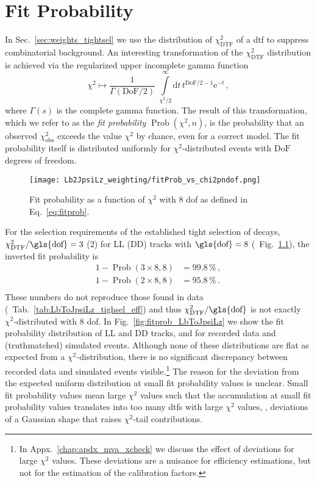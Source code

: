 \chapter{Fit Probability}
\label{chap:apdx_fitprob}
In Sec.~\ref{sec:weights_tightsel} we use the distribution of $\chi^2_\text{DTF}$ of a \gls{dtf} to suppress combinatorial background.
An interesting transformation of the $\chi^2_\text{DTF}$ distribution is achieved via the regularized upper incomplete gamma function
\begin{equation}
    \label{eq:fitprob}
    \chi^2 \mapsto \frac{1}{\Gamma \left(\text{DoF}/2 \right)} \; \int\limits_{\chi^2/2}^{\infty} \! \mathrm{d}t \, t^{\text{DoF}/2 - 1} \mathrm{e}^{-t} \,,
\end{equation}
where $\Gamma(s)$ is the complete gamma function.
The result of this transformation, which we refer to as the \textit{fit probability} $\operatorname{Prob}(\chi^2, n)$, is the probability that an observed  $\chi_\text{obs}^2$ exceeds the value $\chi^2$ by chance, even for a correct model.
The fit probability itself is distributed uniformly for $\chi^2$-distributed events with $\text{DoF}$ degrees of freedom.

\begin{figure}[htbp]
    \centering
    \texttt{[image: Lb2JpsiLz\_weighting/fitProb\_vs\_chi2pndof.png]}
    \caption{Fit probability as a function of $\chi^2$ with $8$ \gls{dof} as defined in Eq.~\eqref{eq:fitprob}.}
    \label{fig:fitprob_vs_chi2}
\end{figure}

For the selection requirements of the established tight selection of \decay{\Lb}{\jpsi\Lz} decays, $\chi^2_\text{DTF} / \text{\gls{dof}} = 3$ ($2$) for \gls{LL} (\gls{DD}) tracks with $\text{\gls{dof}} = 8$ (\cf{}~Fig.~\ref{fig:fitprob_vs_chi2}), the inverted fit probability is
\begin{align*}
    1 - \operatorname{Prob}(3 \times 8, 8) &= 99.8\,\% \,, \\
    1 - \operatorname{Prob}(2 \times 8, 8) &= 95.8\,\% \,. \\
\end{align*}
These numbers do not reproduce those found in data (\cf{}~Tab.~\ref{tab:LbToJpsiLz_tighsel_eff}) and thus
$\chi^2_\text{DTF} / \text{\gls{dof}}$ is not exactly $\chi^2$-distributed with $8$ \gls{dof}.
In Fig.~\ref{fig:fitprob_LbToJpsiLz} we show the fit probability distribution of \gls{LL} and \gls{DD} tracks, and for recorded data and (\gls{truthmatched}) simulated events.
Although none of these distributions are flat as expected from a $\chi^2$-distribution, there is no significant discrepancy between recorded data and simulated events visible.\footnote{In Appx.~\ref{chap:apdx_mva_xcheck} we discuss the effect of deviations for large $\chi^2$ values. These deviations are a nuisance for efficiency estimations, but not for the estimation of the calibration factors.}
The reason for the deviation from the expected uniform distribution at small fit probability values is unclear.
Small fit probability values mean large $\chi^2$ values such that the accumulation at small fit probability values translates into too many \glspl{dtf} with large $\chi^2$ values, \ie{}, deviations of a Gaussian shape that raises $\chi^2$-tail contributions.

